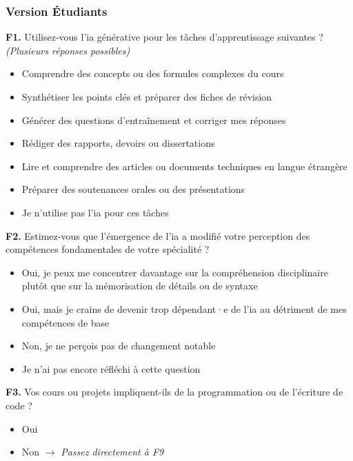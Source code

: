 \subsubsection{Version Étudiants}



\textbf{F1.} Utilisez-vous l'\gls{ia} générative pour les tâches
d'apprentissage suivantes ? \textit{(Plusieurs réponses possibles)}
\begin{itemize}[label=$\square$, leftmargin=1.5cm]
  \item Comprendre des concepts ou des formules complexes du cours
  \item Synthétiser les points clés et préparer des fiches de révision
  \item Générer des questions d'entraînement et corriger mes réponses
  \item Rédiger des rapports, devoirs ou dissertations
  \item Lire et comprendre des articles ou documents techniques en langue
        étrangère
  \item Préparer des soutenances orales ou des présentations
  \item Je n'utilise pas l'\gls{ia} pour ces tâches
\end{itemize}


\textbf{F2.} Estimez-vous que l'émergence de l'\gls{ia} a modifié votre
perception des compétences fondamentales de votre spécialité ?
\begin{itemize}[label=$\square$, leftmargin=1.5cm]
  \item Oui, je peux me concentrer davantage sur la compréhension
        disciplinaire plutôt que sur la mémorisation de détails ou de syntaxe
  \item Oui, mais je crains de devenir trop dépendant·e de l'\gls{ia} au
        détriment de mes compétences de base
  \item Non, je ne perçois pas de changement notable
  \item Je n'ai pas encore réfléchi à cette question
\end{itemize}


\textbf{F3.} Vos cours ou projets impliquent-ils de la programmation ou
de l'écriture de code ?
\begin{itemize}[label=$\square$, leftmargin=1.5cm]
  \item Oui \hspace{1cm} 
  \item Non \hspace{0.9cm} $\rightarrow$ \textit{Passez directement à F9}
\end{itemize}

